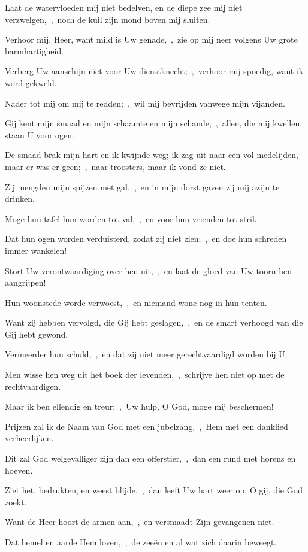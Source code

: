 \documentclass[12pt,twoside,a5paper]{article}
\begin{document}
\begin{halfparskip}
  Laat de watervloeden mij niet bedelven, en de diepe zee mij niet verzwelgen,~\sep\ noch de kuil zijn mond boven mij sluiten.

  Verhoor mij, Heer, want mild is Uw genade,~\sep\ zie op mij neer volgens Uw grote barmhartigheid.

  Verberg Uw aanschijn niet voor Uw dienstknecht;~\sep\ verhoor mij spoedig, want ik word gekweld.

  Nader tot mij om mij te redden;~\sep\ wil mij bevrijden vanwege mijn vijanden.

  Gij kent mijn smaad en mijn schaamte en mijn schande;~\sep\ allen, die mij kwellen, staan U voor ogen.

  De smaad brak mijn hart en ik kwijnde weg; ik zag uit naar een vol medelijden, maar er was er geen;~\sep\ naar troosters, maar ik vond ze niet.

  Zij mengden mijn spijzen met gal,~\sep\ en in mijn dorst gaven zij mij azijn te drinken.

  Moge hun tafel hun worden tot val,~\sep\ en voor hun vrienden tot strik.

  Dat hun ogen worden verduisterd, zodat zij niet zien;~\sep\ en doe hun schreden immer wankelen!

  Stort Uw verontwaardiging over hen uit,~\sep\ en laat de gloed van Uw toorn hen aangrijpen!

  Hun woonstede worde verwoest,~\sep\ en niemand wone nog in hun tenten.

  Want zij hebben vervolgd, die Gij hebt geslagen,~\sep\ en de smart verhoogd van die Gij hebt gewond.

  Vermeerder hun schuld,~\sep\ en dat zij niet meer gerechtvaardigd worden bij U.

  Men wisse hen weg uit het boek der levenden,~\sep\ schrijve hen niet op met de rechtvaardigen.

  Maar ik ben ellendig en treur;~\sep\ Uw hulp, O God, moge mij beschermen!

  Prijzen zal ik de Naam van God met een jubelzang,~\sep\ Hem met een danklied verheerlijken.

  Dit zal God welgevalliger zijn dan een offerstier,~\sep\ dan een rund met horens en hoeven.

  Ziet het, bedrukten, en weest blijde,~\sep\ dan leeft Uw hart weer op, O gij, die God zoekt.

  Want de Heer hoort de armen aan,~\sep\ en versmaadt Zijn gevangenen niet.

  Dat hemel en aarde Hem loven,~\sep\ de zeeën en al wat zich daarin beweegt.


\end{halfparskip}
\end{document}
